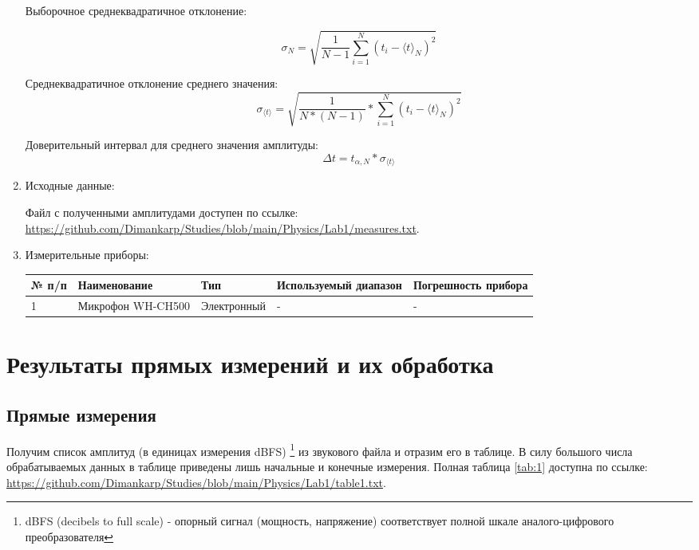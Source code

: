 \documentclass[12pt, a4paper]{article}
\begin{document}
\begin{enumerate}
Выборочное среднеквадратичное отклонение:

\begin{equation}
\sigma_N = \sqrt{\frac{1}{N-1}\sum^N_{i=1} (t_i - \langle t \rangle_N)^2}
\end{equation}

Среднеквадратичное отклонение среднего значения:
\begin{equation}
\sigma_{\langle t \rangle} = \sqrt{ \frac{1}{N * (N-1)} * \sum^N_{i=1} (t_i - \langle t \rangle_N)^2}
\end{equation}

Доверительный интервал для среднего значения амплитуды:
\begin{equation}
\Delta t = t_{\alpha, N} * \sigma_{\langle t \rangle} 
\end{equation}
\item Исходные данные:

Файл с полученными амплитудами доступен по ссылке: \url{https://github.com/Dimankarp/Studies/blob/main/Physics/Lab1/measures.txt}.

\item Измерительные приборы:

\begin{center}

\begin{table}[h!]
\begin{tabular}{|l|l|l|l|l|}
\hline
№ п/п & Наименование & Тип & Используемый диапазон & Погрешность прибора\\
\hline
1 & Микрофон WH-CH500 & Электронный & -  & -\\
\hline
\end{tabular}
\end{table}
\end{center}
\end{enumerate}
\section{Результаты прямых измерений и их обработка}
\subsection{Прямые измерения}

Получим список амплитуд (в единицах измерения dBFS) \footnote{dBFS (decibels to full scale) - опорный сигнал (мощность, напряжение) соответствует полной шкале аналого-цифрового преобразователя} из звукового файла и отразим его в таблице. В силу большого числа обрабатываемых данных в таблице приведены лишь начальные и конечные измерения. Полная таблица \ref{tab:1} доступна по ссылке: \url{https://github.com/Dimankarp/Studies/blob/main/Physics/Lab1/table1.txt}.
\end{document}
